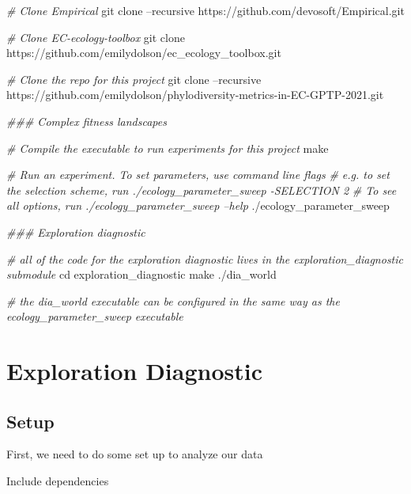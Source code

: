 \documentclass[]{book}
\newenvironment{Shaded}{\begin{snugshade}}{\end{snugshade}}
\newcommand{\BuiltInTok}[1]{#1}
\newcommand{\CommentTok}[1]{\textcolor[rgb]{0.56,0.35,0.01}{\textit{#1}}}
\newcommand{\ExtensionTok}[1]{#1}
\newcommand{\FunctionTok}[1]{\textcolor[rgb]{0.00,0.00,0.00}{#1}}
\newcommand{\NormalTok}[1]{#1}
\begin{document}
\begin{Shaded}
\begin{Highlighting}[]
\CommentTok{# Clone Empirical}
\FunctionTok{git}\NormalTok{ clone --recursive https://github.com/devosoft/Empirical.git }

\CommentTok{# Clone EC-ecology-toolbox}
\FunctionTok{git}\NormalTok{ clone https://github.com/emilydolson/ec_ecology_toolbox.git}

\CommentTok{# Clone the repo for this project}
\FunctionTok{git}\NormalTok{ clone --recursive https://github.com/emilydolson/phylodiversity-metrics-in-EC-GPTP-2021.git}

\CommentTok{### Complex fitness landscapes}

\CommentTok{# Compile the executable to run experiments for this project}
\FunctionTok{make}

\CommentTok{# Run an experiment. To set parameters, use command line flags}
\CommentTok{# e.g. to set the selection scheme, run ./ecology_parameter_sweep -SELECTION 2}
\CommentTok{# To see all options, run ./ecology_parameter_sweep --help}
\ExtensionTok{./ecology_parameter_sweep}

\CommentTok{### Exploration diagnostic}

\CommentTok{# all of the code for the exploration diagnostic lives in the exploration_diagnostic submodule}
\BuiltInTok{cd}\NormalTok{ exploration_diagnostic}
\FunctionTok{make}
\ExtensionTok{./dia_world}

\CommentTok{# the dia_world executable can be configured in the same way as the ecology_parameter_sweep executable}
\end{Highlighting}
\end{Shaded}

\hypertarget{exploration-diagnostic}{%
\chapter{Exploration Diagnostic}\label{exploration-diagnostic}}

\hypertarget{setup}{%
\section{Setup}\label{setup}}

First, we need to do some set up to analyze our data

Include dependencies
\end{document}

